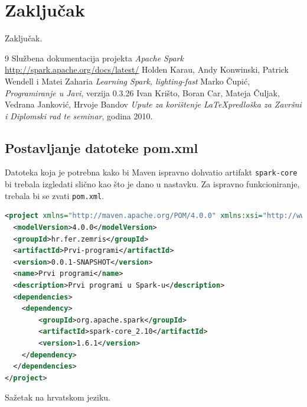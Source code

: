 \documentclass[times, utf8, zavrsni]{fer}
\begin{document}
\chapter{Zaključak} 
Zaključak.

\begin{thebibliography}{9}
  Službena dokumentacija projekta \emph{Apache Spark} \url{http://spark.apache.org/docs/latest/}
  Holden Karau, Andy Konwinski, Patrick Wendell i Matei Zaharia
  \emph{Learning Spark, lighting-fast}
  Marko Čupić,
  \emph{Programiranje u Javi},
  verzija 0.3.26
  Ivan Krišto, Boran Car, Mateja Čuljak, Vedrana Janković, Hrvoje Bandov
  \emph{Upute za korištenje \LaTeX predloška za Završni i Diplomski rad te seminar},
  godina 2010.
\end{thebibliography}

\newpage
\begin{appendices}
\chapter{Postavljanje datoteke pom.xml}
\label{ch:datotekapomXML}
Datoteka koja je potrebna kako bi Maven ispravno dohvatio artifakt \texttt{spark-core} bi trebala izgledati slično kao što je dano u nastavku. Za ispravno funkcioniranje, trebala bi se zvati \texttt{pom.xml}.
\begin{lstlisting}[language=XML]
<project xmlns="http://maven.apache.org/POM/4.0.0" xmlns:xsi="http://www.w3.org/2001/XMLSchema-instance" xsi:schemaLocation="http://maven.apache.org/POM/4.0.0 http://maven.apache.org/xsd/maven-4.0.0.xsd">
  <modelVersion>4.0.0</modelVersion>
  <groupId>hr.fer.zemris</groupId>
  <artifactId>Prvi-programi</artifactId>
  <version>0.0.1-SNAPSHOT</version>
  <name>Prvi programi</name>
  <description>Prvi programi u Spark-u</description>
  <dependencies>
  	<dependency>
  		<groupId>org.apache.spark</groupId>
  		<artifactId>spark-core_2.10</artifactId>
  		<version>1.6.1</version>
  	</dependency>
  </dependencies>
</project>
\end{lstlisting}
\end{appendices}

\begin{sazetak}
Sažetak na hrvatskom jeziku.

\end{sazetak}

\begin{abstract}
Abstract.

\end{abstract}
\end{document}
